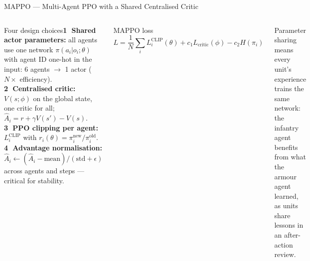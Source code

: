 \documentclass[aspectratio=169,10pt,t]{beamer}
\begin{document}
\begin{frame}{MAPPO --- Multi-Agent PPO with a Shared Centralised Critic}
\begin{columns}[T]
\begin{cbox}{Four design choices}\scriptsize \textbf{\textcircled{\tiny1} Shared actor parameters:} all agents use one network $\pi(a_i|o_i;\theta)$ with agent ID one-hot in the input: 6 agents $\to$ 1 actor ($N\times$ efficiency).\\ \textbf{\textcircled{\tiny2} Centralised critic:} $V(s;\phi)$ on the global state, one critic for all; $\hat A_i=r+\gamma V(s')-V(s)$.\\ \textbf{\textcircled{\tiny3} PPO clipping per agent:} $L_i^{\text{CLIP}}$ with $r_i(\theta)=\pi_i^{\text{new}}/\pi_i^{\text{old}}$.\\ \textbf{\textcircled{\tiny4} Advantage normalisation:} $\hat A_i\leftarrow(\hat A_i-\text{mean})/(\text{std}+\epsilon)$ across agents and steps --- critical for stability.\end{cbox}
\begin{fbx}{MAPPO loss}\[L=\frac1N\sum_iL_i^{\text{CLIP}}(\theta)+c_1L_{\text{critic}}(\phi)-c_2H(\pi_i)\]\end{fbx}
\begin{ibox}\scriptsize Parameter sharing means every unit's experience trains the same network: the infantry agent benefits from what the armour agent learned, as units share lessons in an after-action review.\end{ibox}
\end{columns}
\end{frame}
\end{document}
